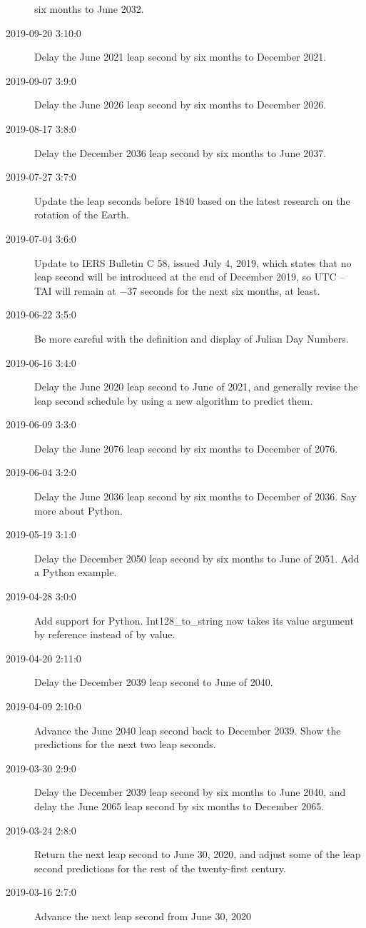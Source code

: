 \documentclass[letterpaper,twoside]{article}
\begin{document}
\begin{description}
  six months to June 2032.
\item[2019-09-20 3:10:0]Delay the June 2021 leap second by six
  months to December 2021.
\item[2019-09-07 3:9:0]Delay the June 2026 leap second by six months
  to December 2026.
\item[2019-08-17 3:8:0]Delay the December 2036 leap second by six
  months to June 2037.
\item[2019-07-27 3:7:0]Update the leap seconds before 1840 based
  on the latest research on the rotation of the Earth.
\item[2019-07-04 3:6:0]Update to IERS Bulletin C 58, issued July
  4, 2019, which states that no leap second will be introduced
  at the end of December 2019, so UTC -- TAI will remain at
  \num{-37} seconds for the next six months, at least.  
\item[2019-06-22 3:5:0] Be more careful with the definition
  and display of Julian Day Numbers.
\item[2019-06-16 3:4:0] Delay the June 2020 leap second to
  June of 2021, and generally revise the leap second schedule
  by using a new algorithm to predict them.
\item[2019-06-09 3:3:0] Delay the June 2076 leap second by
  six months to December of 2076.
\item[2019-06-04 3:2:0] Delay the June 2036 leap second by
  six months to December of 2036.  Say more about Python.
\item[2019-05-19 3:1:0] Delay the December 2050 leap second
  by six months to June of 2051.  Add a Python example.
\item[2019-04-28 3:0:0] Add support for Python.  Int128\_to\_string
  now takes its value argument by reference instead of by value.
\item[2019-04-20 2:11:0] Delay the December 2039 leap second
  to June of 2040.
\item[2019-04-09 2:10:0] Advance the June 2040 leap second back to
  December 2039.  Show the predictions for the next two leap seconds.
\item[2019-03-30 2:9:0] Delay the December 2039 leap second by six
  months to June 2040, and delay the June 2065 leap second by six
  months to December 2065.
\item[2019-03-24 2:8:0] Return the next leap second to June 30, 2020,
  and adjust some of the leap second predictions for the rest of the
  twenty-first century.
\item[2019-03-16 2:7:0] Advance the next leap second from June 30, 2020

\end{description}
\end{document}
